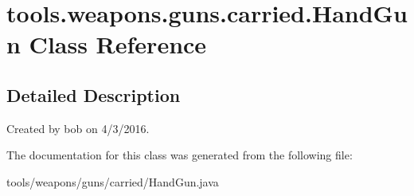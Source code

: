 \hypertarget{classtools_1_1weapons_1_1guns_1_1carried_1_1_hand_gun}{}\section{tools.\+weapons.\+guns.\+carried.\+Hand\+Gun Class Reference}
\label{classtools_1_1weapons_1_1guns_1_1carried_1_1_hand_gun}


\subsection{Detailed Description}
Created by bob on 4/3/2016. 

The documentation for this class was generated from the following file\+:\begin{DoxyCompactItemize}
\item 
tools/weapons/guns/carried/Hand\+Gun.\+java\end{DoxyCompactItemize}
